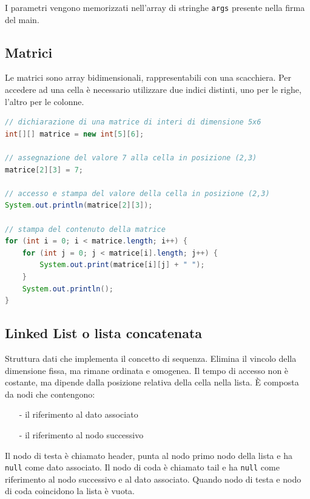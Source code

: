 \documentclass{article}
\begin{document}
I parametri vengono memorizzati nell'array di stringhe \verb|args| presente nella firma del main.

\subsection{Matrici}
Le matrici sono array bidimensionali, rappresentabili con una scacchiera. Per accedere ad una cella è necessario utilizzare due
indici distinti, uno per le righe, l'altro per le colonne.

\begin{lstlisting}[language=Java]
// dichiarazione di una matrice di interi di dimensione 5x6
int[][] matrice = new int[5][6];

// assegnazione del valore 7 alla cella in posizione (2,3)
matrice[2][3] = 7;

// accesso e stampa del valore della cella in posizione (2,3)
System.out.println(matrice[2][3]);

// stampa del contenuto della matrice
for (int i = 0; i < matrice.length; i++) {
	for (int j = 0; j < matrice[i].length; j++) {
		System.out.print(matrice[i][j] + " ");
	}
	System.out.println();
}
\end{lstlisting}

\newpage

\subsection{Linked List o lista concatenata}
Struttura dati che implementa il concetto di sequenza. Elimina il vincolo della dimensione fissa, ma rimane ordinata e omogenea.
Il tempo di accesso non è costante, ma dipende dalla posizione relativa della cella nella lista. È composta da nodi che contengono:
\begin{itemize} [topsep=3pt, itemsep=0pt]
	\item[-] il riferimento al dato associato
	\item[-] il riferimento al nodo successivo
\end{itemize}

Il nodo di testa è chiamato header, punta al nodo primo nodo della lista e ha \verb|null| come dato associato. Il nodo di coda è
chiamato tail e ha \verb|null| come riferimento al nodo successivo e al dato associato. Quando nodo di testa e nodo di coda coincidono
la lista è vuota.
\end{document}
